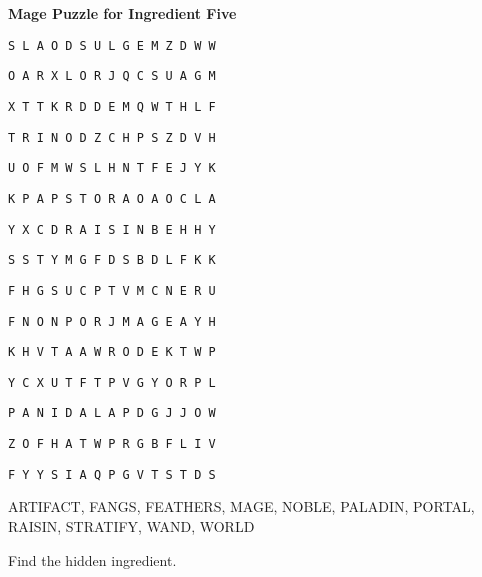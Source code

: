 \documentclass[white]{guildcamp3}
\begin{document}
\name{\wMagePuzzleFive{}} %

\large\textbf{Mage Puzzle for Ingredient Five}  

\texttt{S L A O D S U L G E M Z D W W }

\texttt{O A R X L O R J Q C S U A G M }

\texttt{X T T K R D D E M Q W T H L F }

\texttt{T R I N O D Z C H P S Z D V H }

\texttt{U O F M W S L H N T F E J Y K }

\texttt{K P A P S T O R A O A O C L A }

\texttt{Y X C D R A I S I N B E H H Y }

\texttt{S S T Y M G F D S B D L F K K }

\texttt{F H G S U C P T V M C N E R U }

\texttt{F N O N P O R J M A G E A Y H }

\texttt{K H V T A A W R O D E K T W P }

\texttt{Y C X U T F T P V G Y O R P L }

\texttt{P A N I D A L A P D G J J O W }

\texttt{Z O F H A T W P R G B F L I V }

\texttt{F Y Y S I A Q P G V T S T D S }

ARTIFACT, FANGS, FEATHERS, MAGE, NOBLE, PALADIN, PORTAL, RAISIN, STRATIFY, WAND, WORLD

Find the hidden ingredient.
\end{document}
